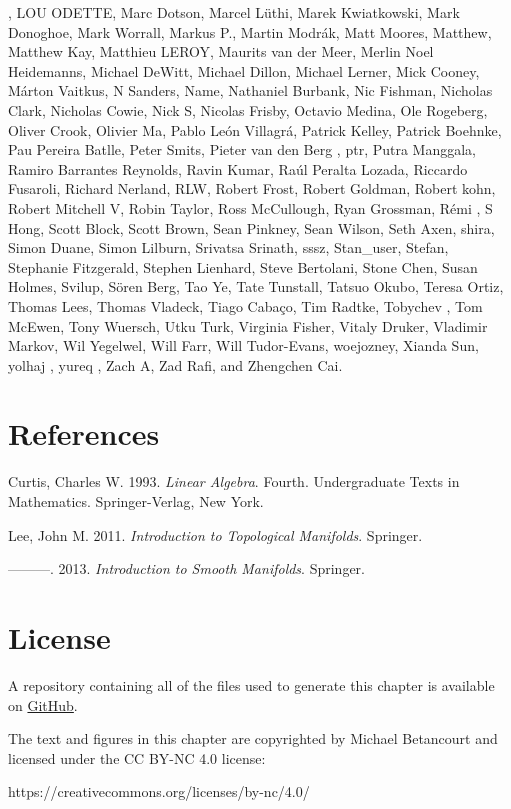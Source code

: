 \documentclass[
  letterpaper,
  DIV=11,
  numbers=noendperiod]{scrartcl}
\newlength{\cslhangindent}
\newlength{\cslentryspacingunit} %
\newenvironment{CSLReferences}[2] %
 {%
  \setlength{\parindent}{0pt}
  \ifodd #1
  \let\oldpar\par
  \def\par{\hangindent=\cslhangindent\oldpar}
  \fi
  \setlength{\parskip}{#2\cslentryspacingunit}
 }%
 {}
\begin{document}
, LOU ODETTE, Marc Dotson, Marcel Lüthi, Marek Kwiatkowski, Mark
Donoghoe, Mark Worrall, Markus P., Martin Modrák, Matt Moores, Matthew,
Matthew Kay, Matthieu LEROY, Maurits van der Meer, Merlin Noel
Heidemanns, Michael DeWitt, Michael Dillon, Michael Lerner, Mick Cooney,
Márton Vaitkus, N Sanders, Name, Nathaniel Burbank, Nic Fishman,
Nicholas Clark, Nicholas Cowie, Nick S, Nicolas Frisby, Octavio Medina,
Ole Rogeberg, Oliver Crook, Olivier Ma, Pablo León Villagrá, Patrick
Kelley, Patrick Boehnke, Pau Pereira Batlle, Peter Smits, Pieter van den
Berg , ptr, Putra Manggala, Ramiro Barrantes Reynolds, Ravin Kumar, Raúl
Peralta Lozada, Riccardo Fusaroli, Richard Nerland, RLW, Robert Frost,
Robert Goldman, Robert kohn, Robert Mitchell V, Robin Taylor, Ross
McCullough, Ryan Grossman, Rémi , S Hong, Scott Block, Scott Brown, Sean
Pinkney, Sean Wilson, Seth Axen, shira, Simon Duane, Simon Lilburn,
Srivatsa Srinath, sssz, Stan\_user, Stefan, Stephanie Fitzgerald,
Stephen Lienhard, Steve Bertolani, Stone Chen, Susan Holmes, Svilup,
Sören Berg, Tao Ye, Tate Tunstall, Tatsuo Okubo, Teresa Ortiz, Thomas
Lees, Thomas Vladeck, Tiago Cabaço, Tim Radtke, Tobychev , Tom McEwen,
Tony Wuersch, Utku Turk, Virginia Fisher, Vitaly Druker, Vladimir
Markov, Wil Yegelwel, Will Farr, Will Tudor-Evans, woejozney, Xianda
Sun, yolhaj , yureq , Zach A, Zad Rafi, and Zhengchen Cai.

\hypertarget{references}{%
\section*{References}\label{references}}

\hypertarget{refs}{}
\begin{CSLReferences}{1}{0}
\leavevmode{}%
Curtis, Charles W. 1993. \emph{Linear Algebra}. Fourth. Undergraduate
Texts in Mathematics. Springer-Verlag, New York.

\leavevmode{}%
Lee, John M. 2011. \emph{Introduction to Topological Manifolds}.
Springer.

\leavevmode{}%
---------. 2013. \emph{Introduction to Smooth Manifolds}. Springer.

\end{CSLReferences}

\hypertarget{license}{%
\section*{License}\label{license}}

A repository containing all of the files used to generate this chapter
is available on
\href{https://github.com/betanalpha/quarto_chapters/tree/main/2_spaces}{GitHub}.

The text and figures in this chapter are copyrighted by Michael
Betancourt and licensed under the CC BY-NC 4.0 license:

https://creativecommons.org/licenses/by-nc/4.0/
\end{document}
